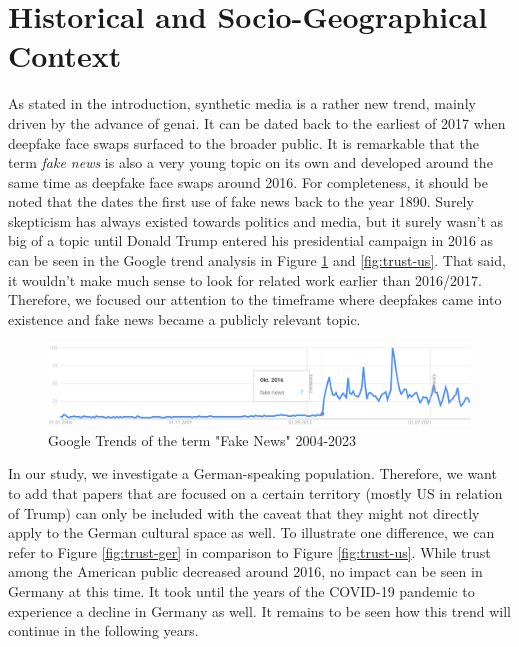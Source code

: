 \documentclass[
  a4paper,  %
  twoside,  %
  bibliography=totoc,
  headsepline,
  cleardoublepage=empty,
  parskip=half,
  draft=false
]{scrbook}
\begin{document}
\section{Historical and Socio-Geographical Context}
\label{sec:hist-context}
As stated in the introduction, synthetic media is a rather new trend, mainly driven by the advance of \gls{genai}. It can be dated back to the earliest of 2017 when deepfake face swaps surfaced to the broader public. It is remarkable that the term \textit{fake news} is also a very young topic on its own and developed around the same time as deepfake face swaps around 2016. For completeness, it should be noted that the \citet{merriam-websterdictionaryRealStoryFake} dates the first use of fake news back to the year 1890. Surely skepticism has always existed towards politics and media, but it surely wasn't as big of a topic until Donald Trump entered his presidential campaign in 2016 as can be seen in the Google trend analysis in Figure \ref{fig:gtrend-fake-news} and \ref{fig:trust-us}. That said, it wouldn't make much sense to look for related work earlier than 2016/2017. Therefore, we focused our attention to the timeframe where deepfakes came into existence and fake news became a publicly relevant topic.
\begin{figure}[h]
  \centering
  \includegraphics[width=1\textwidth]{./graphics/images/gtrends_fakenews_1011-2311.png}
  \caption{Google Trends of the term "Fake News" 2004-2023}
  \label{fig:gtrend-fake-news}
\end{figure}
In our study, we investigate a German-speaking population. Therefore, we want to add that papers that are focused on a certain territory (mostly US in relation of Trump) can only be included with the caveat that they might not directly apply to the German cultural space as well. To illustrate one difference, we can refer to Figure \ref{fig:trust-ger} in comparison to Figure \ref{fig:trust-us}. While trust among the American public decreased around 2016, no impact can be seen in Germany at this time. It took until the years of the COVID-19 pandemic to experience a decline in Germany as well. It remains to be seen how this trend will continue in the following years.
\end{document}
